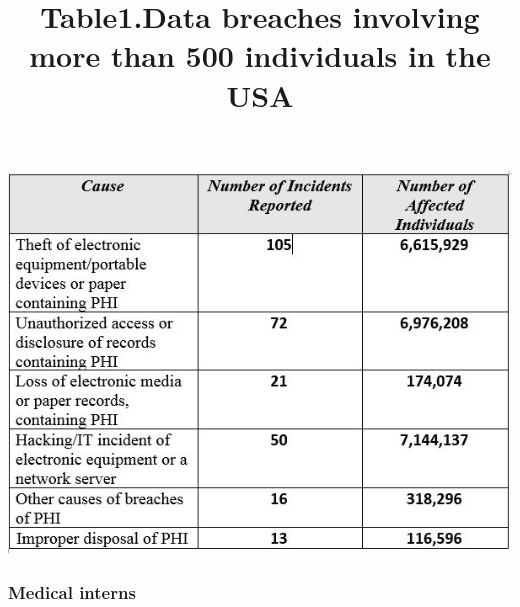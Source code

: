 \begin{center}
	\title{Table1.Data breaches involving more than 500 individuals in the USA \cite{OfficeofCivilRights2014} }
	\includegraphics [scale=1]{Data_Breach_table_2013_2014.JPG}
\end{center}

\subsubsection{Medical interns}

